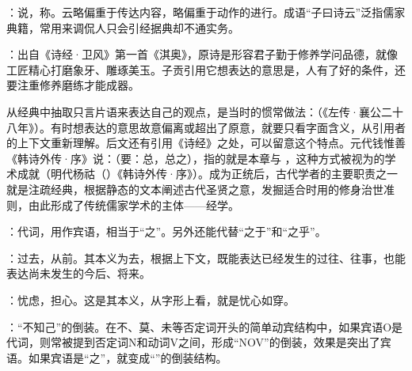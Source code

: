 {\begin{lyblobitemize}
\item {}：说，称。云略偏重于传达内容，略偏重于动作的进行。成语“子曰诗云”泛指儒家典籍，常用来调侃人只会引经据典却不通实务。
\item {}：出自《诗经·卫风》第一首《淇奥》，原诗是形容君子勤于修养学问品德，就像工匠精心打磨象牙、雕琢美玉。子贡引用它想表达的意思是，人有了好的条件，还要注重修养磨练才能成器。

从经典中抽取只言片语来表达自己的观点，是当时的惯常做法：（《左传·襄公二十八年》）。有时想表达的意思故意偏离或超出了原意，就要只看字面含义，从引用者的上下文重新理解。后文还有引用《诗经》之处，可以留意这个特点。元代钱惟善《韩诗外传·序》说：（要：总，总之），指的就是本章与 ，这种方式被视为的学术成就（明代杨祜（）《韩诗外传·序》）。成为正统后，古代学者的主要职责之一就是注疏经典，根据静态的文本阐述古代圣贤之意，发掘适合时用的修身治世准则，由此形成了传统儒家学术的主体——经学。

\item {}：代词，用作宾语，相当于“之”。另外还能代替“之于”和“之乎”。
\item {}：过去，从前。其本义为去，根据上下文，既能表达已经发生的过往、往事，也能表达尚未发生的今后、将来。
\end{lyblobitemize}
}
{}


{
\item {}：忧虑，担心。这是其本义，从字形上看，就是忧心如穿。

\item {}：“不知己”的倒装。在不、莫、未等否定词开头的简单动宾结构中，如果宾语O是代词，则常被提到否定词N和动词V之间，形成“NOV”的倒装，效果是突出了宾语。如果宾语是“之”，就变成“”的倒装结构。
}
{}


